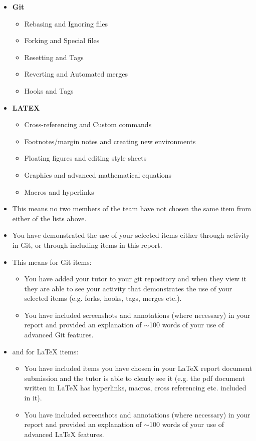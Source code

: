 \documentclass[a4paper, 11pt]{report}
\begin{document}
\begin{itemize}
\begin{itemize}
	\item \textbf{Git}
		\begin{itemize}
		\item Rebasing and Ignoring files
		\item Forking and Special files
		\item Resetting and Tags
		\item Reverting and Automated merges
		\item Hooks and Tags
		\end{itemize}
	\item \textbf{LATEX}
		\begin{itemize}
		\item Cross-referencing and Custom commands
		\item Footnotes/margin notes and creating new environments
		\item Floating figures and editing style sheets
		\item Graphics and advanced mathematical equations
		\item Macros and hyperlinks
		\end{itemize}
	\item This means no two members of the team have not chosen the same item from either of the lists above.
	\item You have demonstrated the use of your selected items either through activity in Git, or through including items in this report.
	\item This means for Git items:
		\begin{itemize}
		\item You have added your tutor to your git repository and when they view it they are able to see your activity that demonstrates the use of your selected items (e.g. forks, hooks, tags, merges etc.).
		\item You have included screenshots and annotations (where necessary) in your report and provided an explanation of $\sim$100 words of your use of advanced Git features.
		\end{itemize}
	\item and for LaTeX items:
		\begin{itemize}
		\item You have included items you have chosen in your LaTeX report document submission and the tutor is able to clearly see it (e.g. the pdf document written in LaTeX has hyperlinks, macros, cross referencing etc. included in it).
		\item You have included screenshots and annotations (where necessary) in your report and provided an explanation of $\sim$100 words of your use of advanced LaTeX features.

\end{itemize}
\end{itemize}
\end{itemize}
\end{document}
